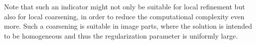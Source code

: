 \documentclass[enabledeprecatedfontcommands,cleardoublepage=empty,headsepline,twoside,11pt,DIV=15,BCOR=12mm,final]{scrartcl}
\begin{document}

Note that such an indicator might not only be suitable for local refinement but also for local coarsening, in order to reduce the computational complexity even more. Such a coarsening is suitable in image parts, where the solution is intended to be homogeneous and thus the regularization parameter is uniformly large.
 
\end{document}
